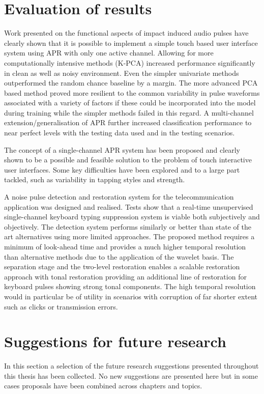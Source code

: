 \section{Evaluation of results}
Work presented on the functional aspects of impact induced audio pulses have clearly shown that it is possible to implement a simple touch based user interface system using APR with only one active channel. Allowing for more computationally intensive methods (K-PCA) increased performance significantly in clean as well as noisy environment. Even the simpler univariate methods outperformed the random chance baseline by a margin. The more advanced PCA based method proved more resilient to the common variability in pulse waveforms associated with a variety of factors if these could be incorporated into the model during training while the simpler methods failed in this regard. A multi-channel extension/generalisation of APR further increased classification performance to near perfect levels with the testing data used and in the testing scenarios.

The concept of a single-channel APR system has been proposed and clearly shown to be a possible and feasible solution to the problem of touch interactive user interfaces. Some key difficulties have been explored and to a large part tackled, such as variability in tapping styles and strength.

A noise pulse detection and restoration system for the telecommunication application was designed and realised. Tests show that a real-time unsupervised single-channel keyboard typing suppression system is viable both subjectively and objectively. The detection system performs similarly or better than state of the art alternatives using more limited approaches. The proposed method requires a minimum of look-ahead time and provides a much higher temporal resolution than alternative methods due to the application of the wavelet basis. The separation stage and the two-level restoration enables a scalable restoration approach with tonal restoration providing an additional line of restoration for keyboard pulses showing strong tonal components. The high temporal resolution would in particular be of utility in scenarios with corruption of far shorter extent such as clicks or transmission errors.

\section{Suggestions for future research}
In this section a selection of the future research suggestions presented throughout this thesis has been collected. No new suggestions are presented here but in some cases proposals have been combined across chapters and topics.

